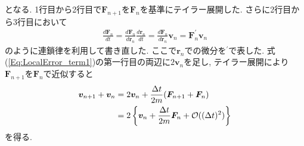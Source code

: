 となる. 
1行目から2行目で$\bm{F}_{n+1}$を$\bm{F}_{n}$を基準にテイラー展開した.
さらに2行目から3行目において
\begin{align}
  \frac{d \bm{F}_{n}}{dt}
= \frac{d \bm{F}_{n}}{d \bm{r}_{n}} \frac{d \bm{r}_{n}}{dt}
= \frac{d \bm{F}_{n}}{d \bm{r}_{n}} \bm{v}_{n}
= \bm{F}_{n}^{\prime} \bm{v}_{n}
\end{align}
のように連鎖律を利用して書き直した. ここで$\bm{r}_{n}$での微分を$^{\prime}$で表した.
式(\ref{Eq:LocalError_term1})の第一行目の両辺に$2\bm{v}_{n}$を足し, テイラー展開により
$\bm{F}_{n+1}$を$\bm{F}_{n}$で近似すると
\begin{align}
   \bm{v}_{n+1} + \bm{v}_{n} 
&=
   2\bm{v}_{n} + \frac{\Delta t}{2m}(\bm{F}_{n+1} + \bm{F}_{n})
   \notag
   \\
&=
   2 \left\{
             \bm{v}_{n} + \frac{\Delta t}{2m} \bm{F}_{n} 
           + \mathcal{O}((\Delta t)^{2})
     \right\}
  \label{Eq:LocalError_term2}
\end{align}
を得る.

